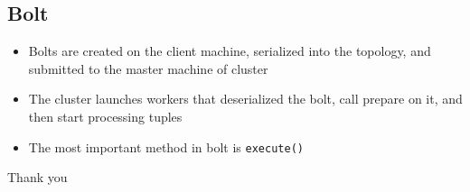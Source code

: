 \documentclass{beamer}
\begin{document}
\subsection{Bolt}
\begin{frame}
    \begin{itemize}
        \item Bolts are created on the client machine, serialized into the
            topology, and submitted to the master machine of cluster
        \item The cluster launches workers that deserialized the bolt,
            call prepare on it, and then start processing tuples
        \item The most important method in bolt is \texttt{execute()}
    \end{itemize}
\end{frame}
\begin{frame}
\Huge{\centerline{Thank you}}
\end{frame}
\end{document}
